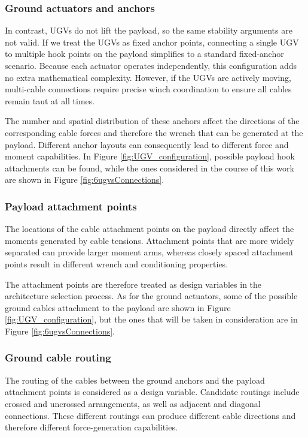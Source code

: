 \subsubsection{Ground actuators and anchors}

In contrast, UGVs do not lift the payload, so the same stability arguments are not valid. If we treat the UGVs as fixed anchor points, connecting a single UGV to multiple hook points on the payload simplifies to a standard fixed-anchor scenario. Because each actuator operates independently, this configuration adds no extra mathematical complexity. However, if the UGVs are actively moving, multi-cable connections require precise winch coordination to ensure all cables remain taut at all times.

The number and spatial distribution of these anchors affect the directions of the corresponding cable forces and therefore the wrench that can be generated at the payload. Different anchor layouts can consequently lead to different force and moment capabilities. In Figure \ref{fig:UGV_configuration}, possible payload hook attachments can be found, while the ones considered in the course of this work are shown in Figure \ref{fig:6ugvsConnections}.

\subsubsection{Payload attachment points}

The locations of the cable attachment points on the payload directly affect the moments generated by cable tensions. Attachment points that are more widely separated can provide larger moment arms, whereas closely spaced attachment points result in different wrench and conditioning properties.

The attachment points are therefore treated as design variables in the architecture selection process. As for the ground actuators, some of the possible ground cables attachment to the payload are shown in Figure \ref{fig:UGV_configuration}, but the ones that will be taken in consideration are in Figure \ref{fig:6ugvsConnections}.

\subsubsection{Ground cable routing}

The routing of the cables between the ground anchors and the payload attachment points is considered as a design variable. Candidate routings include crossed and uncrossed arrangements, as well as adjacent and diagonal connections. These different routings can produce different cable directions and therefore different force-generation capabilities.



